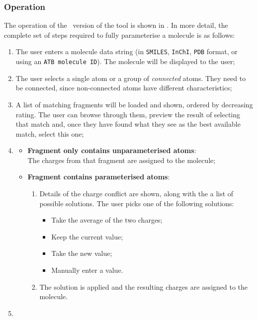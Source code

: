\subsubsection{Operation}
The operation of the \IDa\ version of the tool is shown in . In more detail, the complete set of steps required to fully parameterise a molecule is as follows:
\begin{enumerate}[itemsep=.1em, parsep=.2em, topsep=0em]
\item The user enters a molecule data string (in \verb|SMILES|, \verb|InChI|, \verb|PDB| format, or using an \verb|ATB molecule ID|). The molecule will be displayed to the user;
\item The user selects a single atom or a group of \emph{connected} atoms. They need to be connected, since non-connected atoms have different characteristics;
\item A list of matching fragments will be loaded and shown, ordered by decreasing rating. The user can browse through them, preview the result of selecting that match and, once they have found what they see as the best available match, select this one;
\item
  \begin{itemize}[leftmargin=0cm, itemsep=.1em, parsep=.1em]
  \item[] {\bf Fragment only contains unparameterised atoms}:\\
    The charges from that fragment are assigned to the molecule;
  \item[]{\bf Fragment contains parameterised atoms}:
    \begin{enumerate}
    \item
      Details of the charge conflict are shown, along with the a list of possible solutions. The user picks one of the following solutions:
      \begin{itemize}[itemsep=.1em, parsep=.2em, topsep=0em]
      \item Take the average of the two charges;
      \item Keep the current value;
      \item Take the new value;
      \item Manually enter a value.
      \end{itemize}
    \item The solution is applied and the resulting charges are assigned to the molecule.
    \end{enumerate}
  \end{itemize}
\item

\end{enumerate}
